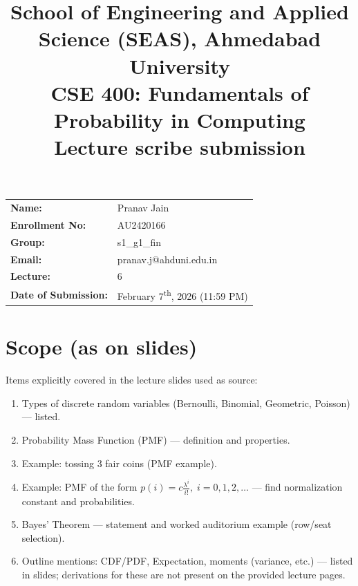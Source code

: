 \documentclass[11pt]{article}
\title{
    \normalsize School of Engineering and Applied Science (SEAS), Ahmedabad University \\
    \vspace{0.2cm}
    \textbf{CSE 400: Fundamentals of Probability in Computing}\\
    \Large Lecture scribe submission
}
\author{}
\date{}
\begin{document}
\maketitle

\vspace{-2cm}
\begin{center}
    \begin{tabular}{ll}
        \textbf{Name:} & Pranav Jain \\[1.5ex]
        \textbf{Enrollment No:} & AU2420166 \\[1.5ex]
        \textbf{Group:} & s1\_g1\_fin \\[1.5ex]
        \textbf{Email:} & pranav.j@ahduni.edu.in \\[1.5ex]
        \textbf{Lecture:} & 6 \\[1.5ex]
        \textbf{Date of Submission:} & February 7\textsuperscript{th}, 2026 (11:59 PM)
    \end{tabular}
\end{center}

\bigskip

\section{Scope (as on slides)}
Items explicitly covered in the lecture slides used as source:
\begin{enumerate}[left=0pt]
    \item Types of discrete random variables (Bernoulli, Binomial, Geometric, Poisson) — listed.
    \item Probability Mass Function (PMF) — definition and properties.
    \item Example: tossing 3 fair coins (PMF example).
    \item Example: PMF of the form \(p(i)=c\frac{\lambda^i}{i!},\; i=0,1,2,\dots\) — find normalization constant and probabilities.
    \item Bayes' Theorem — statement and worked auditorium example (row/seat selection).
    \item Outline mentions: CDF/PDF, Expectation, moments (variance, etc.) — listed in slides; derivations for these are not present on the provided lecture pages.
\end{enumerate}
\end{document}
